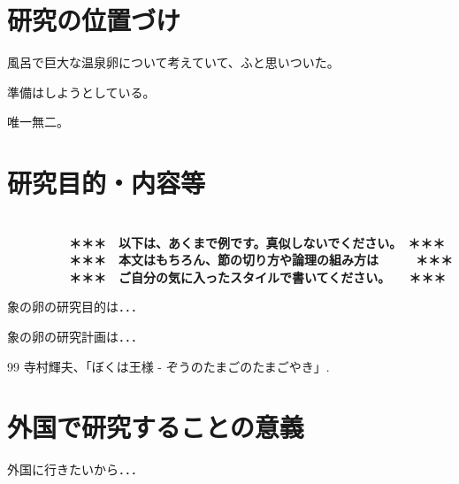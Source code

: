 \documentclass[11pt,a4j,dvipdfmx]{jarticle} 					%
\newcommand{\研究課題名}{象の卵}
\newcommand{\研究機関名}{逢坂大学}
\newcommand{\研究代表者氏名}{湯川秀樹}
\begin{document}

\section{研究の位置づけ}

		風呂で巨大な温泉卵について考えていて、ふと思いついた。

	準備はしようとしている。

	唯一無二。




\section{研究目的・内容等}

\textbf{\\　　　　　＊＊＊　以下は、あくまで例です。真似しないでください。　＊＊＊\\
　　　　　＊＊＊　本文はもちろん、節の切り方や論理の組み方は　　　＊＊＊\\
　　　　　＊＊＊　ご自分の気に入ったスタイルで書いてください。　　＊＊＊}

	 象の卵の研究目的は．．．

	象の卵の研究計画は．．．

	\vspace{1cm}
	\begin{thebibliography}{99}
		 寺村輝夫、「ぼくは王様 - ぞうのたまごのたまごやき」.
	\end{thebibliography}



\section{外国で研究することの意義}

	外国に行きたいから．．．
\end{document}
